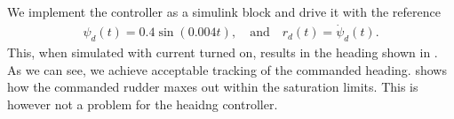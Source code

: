 \subsection{}
We implement the controller as a simulink block and drive it with the reference
\begin{equation}\begin{aligned}
\psi_d(t) = 0.4 \sin (0.004t), \quad \text{and} \quad
r_d(t) = \dot \psi_d(t).
\end{aligned}\end{equation}
This, when simulated with current turned on, results in the heading shown in . As we can see, we achieve acceptable tracking of the commanded heading.  shows how the commanded rudder maxes out within the saturation limits. This is however not a problem for the heaidng controller.


